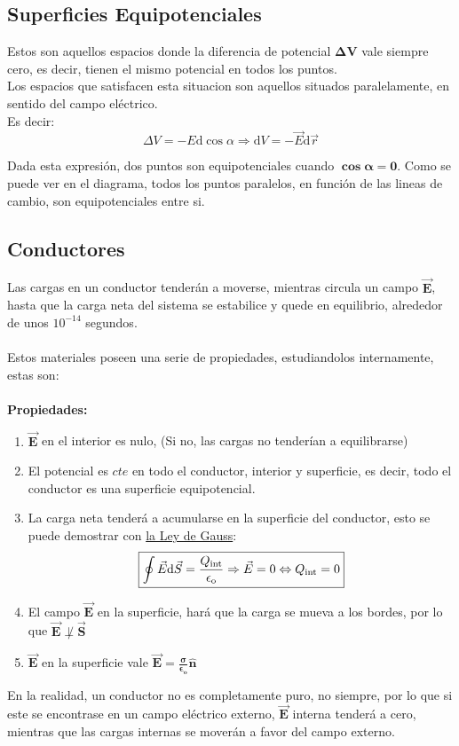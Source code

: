 \subsection{Superficies Equipotenciales}
\noindent Estos son aquellos espacios donde la diferencia de potencial \(\bm{\Delta V}\) vale siempre cero, es decir, tienen el mismo potencial en todos los puntos. \\
Los espacios que satisfacen esta situacion son aquellos situados paralelamente, en sentido del campo eléctrico. \\ Es decir:
\[
        \boxed{\Delta V = - E \mathrm{d} \cos{\alpha} \Rightarrow \mathrm{d}V = - \vec{E}\mathrm{d}\vec{r}}
\]
\begin{wrapfigure}{r}{5cm}
        
\end{wrapfigure}
Dada esta expresión, dos puntos son equipotenciales cuando \(\bm{\cos{\bm{\alpha}} = 0}\). Como se puede ver en el diagrama, todos los puntos paralelos, en función de las lineas de cambio, son equipotenciales entre si.
\subsection{Conductores}
\noindent Las cargas en un conductor tenderán a moverse, mientras circula un campo \(\bm{\vec{E}}\), hasta que la carga neta del sistema se estabilice y quede en equilibrio, alrededor de unos \(10^{-14}\) segundos.\\\\
Estos materiales poseen una serie de propiedades, estudiandolos internamente, estas son:\\\\
\hspace{3cm}\textbf{Propiedades:}
\begin{enumerate}
        \item \(\bm{\vec{E}}\) en el interior es nulo, (Si no, las cargas no tenderían a equilibrarse)
        \item  El potencial es \(cte\) en todo el conductor, interior y superficie, es decir, todo el conductor es una superficie equipotencial.
        \item La carga neta tenderá a acumularse en la superficie del conductor, esto se puede demostrar con \underline{la Ley de Gauss}:
              \[
                      \boxed{\oint \vec{E} \mathrm{d} \vec{S} = \frac{Q_{\textnormal{int}}}{\epsilon_{\textnormal{o}}} \Rightarrow \vec{E} = 0 \Leftrightarrow  Q_{\textnormal{int}} = 0}
              \]
        \item El campo \(\bm{\vec{E}}\) en la superficie, hará que la carga se mueva a los bordes, por lo que \(\bm{\vec{E} \not \perp \vec{S}}\)
        \item \(\bm{\vec{E}}\) en la superficie vale \(\bm{\vec{E} = \frac{\sigma}{\epsilon_o}\hat{n}}\)
\end{enumerate}
\vspace{0.5cm}
En la realidad, un conductor no es completamente puro, no siempre, por lo que si este se encontrase en un campo eléctrico externo, \(\bm{\vec{E}}\) interna tenderá a cero, mientras que las cargas internas se moverán a favor del campo externo.
